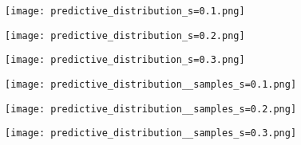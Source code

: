 \documentclass[]{scrartcl}
\begin{document}
	
	\begin{figure*}[t]
		\centering
		\begin{subfigure}[b]{\textwidth}
			\centering
			\texttt{[image: predictive\_distribution\_s=0.1.png]} 
			
		\end{subfigure}
		\hfill
		\begin{subfigure}[b]{\textwidth}  
			\centering 
			\texttt{[image: predictive\_distribution\_s=0.2.png]}
			
		\end{subfigure}
		\hfill
		\begin{subfigure}[b]{\textwidth}  
			\centering 
			\texttt{[image: predictive\_distribution\_s=0.3.png]}
			
		\end{subfigure}
		\caption{Plots of the predictive distribution corresponding to exercise 1.}
		\label{fig:predictive_dist}
	\end{figure*}
	
	\begin{figure*}[t]
		\centering
		\begin{subfigure}[b]{\textwidth}
			\centering
			\texttt{[image: predictive\_distribution\_\_samples\_s=0.1.png]} 
			
		\end{subfigure}
		\hfill
		\begin{subfigure}[b]{\textwidth}  
			\centering 
			\texttt{[image: predictive\_distribution\_\_samples\_s=0.2.png]}
			
		\end{subfigure}
		\hfill
		\begin{subfigure}[b]{\textwidth}  
			\centering 
			\texttt{[image: predictive\_distribution\_\_samples\_s=0.3.png]}
			
		\end{subfigure}
		\caption{Plots of $y(x,\vec{w})$ using samples from the predictive distributions shown in figure \ref{fig:predictive_dist}, corresponding to  exercise 2.}
		\label{fig:samples}
	\end{figure*}
	
\end{document}
